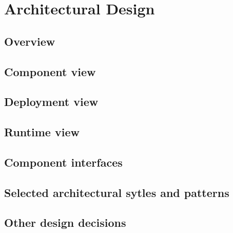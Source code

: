 \section{Architectural Design}
\label{sec:arcdes}

\subsection{Overview}

\subsection{Component view}

\subsection{Deployment view}

\subsection{Runtime view}

\subsection{Component interfaces}

\subsection{Selected architectural sytles and patterns}

\subsection{Other design decisions}